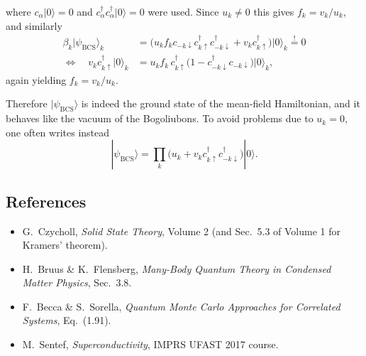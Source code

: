 \documentclass[../../main.tex]{subfiles}
\begin{document}
where $c_\alpha|0\rangle=0$ and $c^\dagger_\alpha c^\dagger_\alpha|0\rangle=0$ were used.
Since $u_k\neq0$ this gives $f_k=v_k/u_k$, and similarly
\begin{align}
\beta_k|\psi_{\mathrm{BCS}}\rangle_k
&=\big(u_kf_k c_{-k\downarrow}c^\dagger_{k\uparrow}c^\dagger_{-k\downarrow}
 +v_k c^\dagger_{k\uparrow}\big)|0\rangle_k\overset{!}{=}0\\
\Longleftrightarrow\quad
v_k c^\dagger_{k\uparrow}|0\rangle_k
&=u_kf_k\,c^\dagger_{k\uparrow}
 \big(1-c^\dagger_{-k\downarrow}c_{-k\downarrow}\big)|0\rangle_k ,
\end{align}
again yielding $f_k=v_k/u_k$.

Therefore $|\psi_{\mathrm{BCS}}\rangle$ is indeed the ground state of the mean-field
Hamiltonian, and it behaves like the vacuum of the Bogoliubons. To avoid problems due to
$u_k=0$, one often writes instead
\begin{equation}
|\psi_{\mathrm{BCS}}\rangle
=\prod_k\big(u_k+v_k c^\dagger_{k\uparrow}c^\dagger_{-k\downarrow}\big)|0\rangle .
\end{equation}

\subsection{References}
\begin{itemize}
\item G.\ Czycholl, \emph{Solid State Theory}, Volume 2 (and Sec.~5.3 of Volume 1 for
      Kramers' theorem).
\item H.\ Bruus \& K.\ Flensberg, \emph{Many-Body Quantum Theory in Condensed Matter
      Physics}, Sec.~3.8.
\item F.\ Becca \& S.\ Sorella, \emph{Quantum Monte Carlo Approaches for Correlated
      Systems}, Eq.~(1.91).
\item M.\ Sentef, \emph{Superconductivity}, IMPRS UFAST 2017 course.
\end{itemize}
\end{document}
